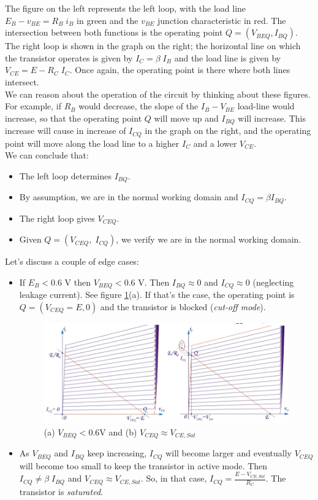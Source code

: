 The figure on the left represents the left loop, with the load line $E_B - v_{BE} = R_B \; i_B $ in green and the $v_{BE}$ junction characteristic in red. The intersection between both functions is the operating point $Q = (V_{BEQ}, I_{BQ})$.\\
The right loop is shown in the graph on the right; the horizontal line on which the transistor operates is given by $I_{C} = \beta \; I_{B}$ and the load line is given by $V_{CE} = E - R_C \; I_{C}$. Once again, the operating point is there where both lines intersect.\\
We can reason about the operation of the circuit by thinking about these figures. For example, if $R_B$ would decrease, the slope of the $I_B - V_{BE}$ load-line would increase, so that the operating point $Q$ will move up and $I_{BQ}$ will increase. This increase will cause in increase of $I_{CQ}$ in the graph on the right, and the operating point will move along the load line to a higher $I_{C}$ and a lower $V_{CE}$.\\
We can conclude that:
\begin{itemize}
	\item The left loop determines $I_{BQ}$.
	\item By assumption, we are in the normal working domain and $I_{CQ} = \beta I_{BQ}$.
	\item The right loop gives  $V_{CEQ}$.
	\item Given $Q = (V_{CEQ}, \; I_{CQ})$, we verify we are in the normal working domain.
\end{itemize}
Let's discuss a couple of edge cases:
\begin{itemize}
	\item If $E_{B} < 0.6$ V then $V_{BEQ} < 0.6$ V. Then $I_{BQ} \approx 0$ and $I_{CQ} \approx 0$ (neglecting leakage current). See figure \ref{fig:bjt_load3}(a). If that's the case, the operating point is $Q = (V_{CEQ} = E, 0)$ and the transistor is blocked (\emph{cut-off mode}). 
	\begin{figure}[h!]
		\centering
		\includegraphics[width=14cm]{figures/ch02/bjt_load3.jpg}
		\caption{(a) $V_{BEQ} < 0.6$V and (b) $V_{CEQ} \approx V_{CE, Sat}$} 
		\label{fig:bjt_load3}
	\end{figure}
	\item As $V_{BEQ}$ and $I_{BQ}$ keep increasing, $I_{CQ}$ will become larger and eventually $V_{CEQ}$ will become too small to keep the transistor in active mode. Then $I_{CQ} \ne \beta \;I_{BQ}$ and $V_{CEQ} \approx V_{CE, Sat}$. So, in that case, $I_{CQ} = \frac{E-V_{CE,Sat}}{R_C}$. The transistor is \emph{saturated}.
\end{itemize}
